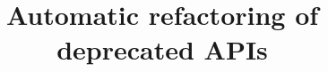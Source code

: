 \documentclass[10pt,conference]{IEEEtran}
\begin{document}




\title{Automatic refactoring of deprecated APIs} %








\maketitle
\end{document}
